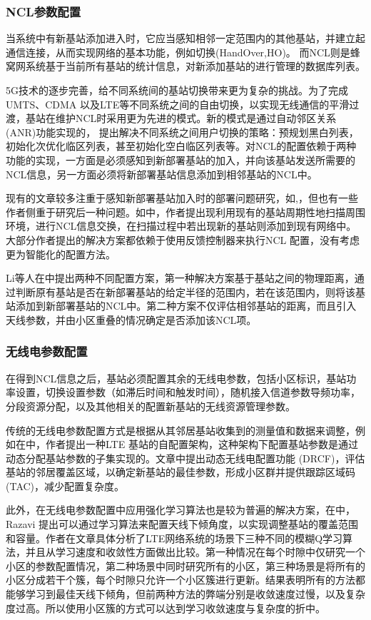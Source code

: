 \documentclass{IEEEtran}
\begin{document}
\subsubsection{NCL参数配置}

当系统中有新基站添加进入时，它应当感知相邻一定范围内的其他基站，并建立起通信连接，从而实现网络的基本功能，例如切换(HandOver,HO)。 而NCL则是蜂窝网系统基于当前所有基站的统计信息，对新添加基站的进行管理的数据库列表。

5G技术的逐步完善，给不同系统间的基站切换带来更为复杂的挑战。为了完成UMTS、CDMA 以及LTE等不同系统之间的自由切换，以实现无线通信的平滑过渡，基站在维护NCL时采用更为先进的模式。新的模式是通过自动邻区关系(ANR)功能实现的，\cite{3gpp.32.511} 提出解决不同系统之间用户切换的策略：预规划黑白列表，初始化次优化临区列表，甚至初始化空白临区列表等。对NCL的配置依赖于两种功能的实现，一方面是必须感知到新部署基站的加入，并向该基站发送所需要的NCL信息，另一方面必须将新部署基站信息添加到相邻基站的NCL中。

现有的文章较多注重于感知新部署基站加入时的部署问题研究，如\cite{Lee2014},\cite{Kim2010}，但也有一些作者侧重于研究后一种问题。如\cite{Wainio2016}中，作者提出现利用现有的基站周期性地扫描周围环境，进行NCL信息交换，在扫描过程中若出现新的基站则添加到现有网络中。大部分作者提出的解决方案都依赖于使用反馈控制器来执行NCL 配置，没有考虑更为智能化的配置方法。

Li等人在\cite{Li2007}中提出两种不同配置方案，第一种解决方案基于基站之间的物理距离，通过判断原有基站是否在新部署基站的给定半径的范围内，若在该范围内，则将该基站添加到新部署基站的NCL中。第二种方案不仅评估相邻基站的距离，而且引入天线参数，并由小区重叠的情况确定是否添加该NCL项。


\subsubsection{无线电参数配置}
在得到NCL信息之后，基站必须配置其余的无线电参数，包括小区标识，基站功率设置，切换设置参数（如滞后时间和触发时间），随机接入信道参数导频功率，分段资源分配，以及其他相关的配置新基站的无线资源管理参数。

传统的无线电参数配置方式是根据从其邻居基站收集到的测量值和数据来调整，例如在\cite{Sanneck2010}中，作者提出一种LTE 基站的自配置架构，这种架构下配置基站参数是通过动态分配基站参数的子集实现的。文章中提出动态无线电配置功能 (DRCF)，评估基站的邻居覆盖区域，以确定新基站的最佳参数，形成小区群并提供跟踪区域码(TAC)，减少配置复杂度。

此外，在无线电参数配置中应用强化学习算法也是较为普遍的解决方案，在\cite{Razavi2010}中，Razavi 提出可以通过学习算法来配置天线下倾角度，以实现调整基站的覆盖范围和容量。作者在文章具体分析了LTE网络系统的场景下三种不同的模糊Q学习算法，并且从学习速度和收敛性方面做出比较。第一种情况在每个时隙中仅研究一个小区的参数配置情况，第二种场景中同时研究所有的小区，第三种场景是将所有的小区分成若干个簇，每个时隙只允许一个小区簇进行更新。结果表明所有的方法都能够学习到最佳天线下倾角，但前两种方法的弊端分别是收敛速度过慢，以及复杂度过高。所以使用小区簇的方式可以达到学习收敛速度与复杂度的折中。
\end{document}
